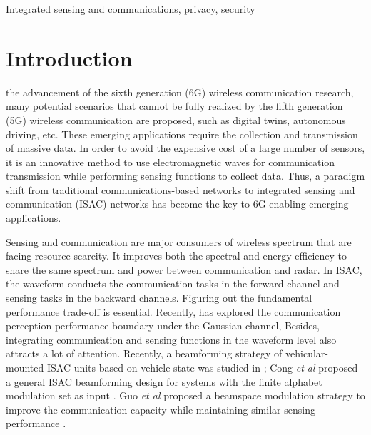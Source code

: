 \documentclass[10pt,journal,twocolumn,twoside]{IEEEtran} %
\begin{document}
 \begin{IEEEkeywords}
Integrated sensing and communications, privacy, security 
 \end{IEEEkeywords}


\section{Introduction} 
 the advancement of the sixth generation (6G) wireless communication research, many potential scenarios that cannot be fully realized by the fifth generation (5G) wireless communication are proposed, such as digital twins, autonomous driving, etc. These emerging applications require the collection and transmission of massive data. In order to avoid the expensive cost of a large number of sensors, it is an innovative method to use electromagnetic waves for communication transmission while performing sensing functions to collect data. Thus, a paradigm shift  from traditional communications-based networks to integrated sensing and communication (ISAC) networks has become the key to 6G enabling emerging applications\cite{9737357}.

Sensing and communication are major consumers of wireless spectrum that are facing resource scarcity. It improves both the spectral and energy efficiency to share the same spectrum and power between communication and radar. In ISAC, the waveform conducts the communication tasks in the forward channel and sensing tasks in the backward channels. Figuring out the fundamental performance trade-off is essential. Recently, \cite{10147248} has explored the communication perception performance boundary under the Gaussian channel, Besides, integrating communication and sensing functions in the waveform level also attracts a lot of attention.  Recently, a beamforming strategy of vehicular-mounted ISAC units based on vehicle state was studied in \cite{10063187}; Cong \emph{et al} proposed a general ISAC beamforming design for systems with the finite alphabet modulation set as input \cite{CongFinite2022}. Guo \emph{et al} proposed a beamspace modulation strategy to improve the communication capacity while maintaining similar sensing performance \cite{ShuaishuaiGuo:Mobicom2022}. 
\end{document}
